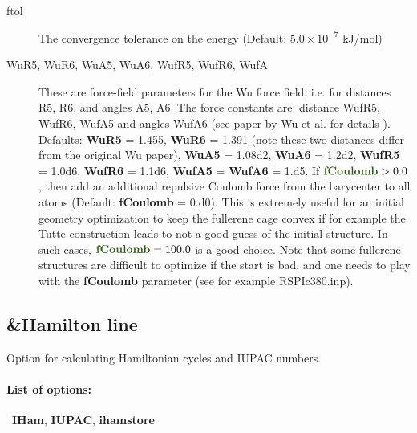 \documentclass[article,a4paper,twoside]{memoir}
\newcommand{\paramname}[1]{{\color{green}\textbf{#1}}}
\begin{document}
\begin{description}
\item[ftol] The convergence tolerance on the energy (Default: $5.0 \times 10^{-7}$ kJ/mol)
\item[{WuR5, WuR6, WuA5, WuA6, WufR5, WufR6, WufA}] These are force-field parameters for the Wu force field, i.e. for
distances R5, R6, and angles A5, A6. The force constants are: distance WufR5, WufR6, WufA5 and
angles WufA6 (see paper by Wu et al. for details \cite{Wu87}). Defaults: \paramname{WuR5} =  1.455, \paramname{WuR6} = 1.391 
(note these two distances differ from the original Wu paper), \paramname{WuA5} = 1.08d2, 
\paramname{WuA6} = 1.2d2, \paramname{WufR5} = 1.0d6, \paramname{WufR6} = 1.1d6, \paramname{WufA5} = \paramname{WufA6} = 1.d5.
If $\paramname{fCoulomb} > 0.0$, then add an additional repulsive Coulomb force from the barycenter to all atoms (Default:  \paramname{fCoulomb} = 0.d0).
This is extremely useful for an initial geometry optimization to keep the fullerene cage convex if for example the Tutte construction leads to not
a good guess of the initial structure. In such cases, $\paramname{fCoulomb} = 100.0$ is a good choice. Note that some fullerene structures
are difficult to optimize if the start is bad, and one needs to play with the \paramname{fCoulomb} parameter (see for example {RSPIc380.inp}).
\end{description}


\subsection{\&Hamilton line}
Option for calculating Hamiltonian cycles and IUPAC numbers.
\paragraph{List of options:}\  \paramname{IHam}, \paramname{IUPAC}, \paramname{ihamstore}
\end{document}
